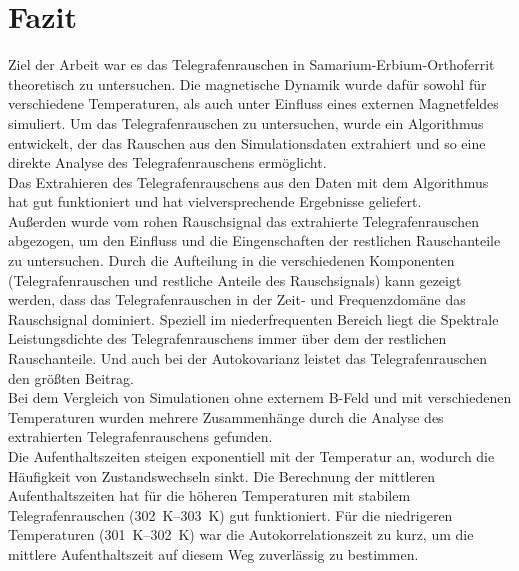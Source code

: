 \documentclass[main.tex]{subfiles}
\begin{document}
\newpage
\section{Fazit}

Ziel der Arbeit war es das Telegrafenrauschen in Samarium-Erbium-Orthoferrit theoretisch zu untersuchen. Die magnetische Dynamik wurde dafür sowohl für verschiedene Temperaturen, als auch unter Einfluss eines externen Magnetfeldes simuliert. 
Um das Telegrafenrauschen zu untersuchen, wurde ein Algorithmus entwickelt, der das Rauschen aus den Simulationsdaten extrahiert und so eine direkte Analyse des Telegrafenrauschens ermöglicht.\\

Das Extrahieren des Telegrafenrauschens aus den Daten mit dem Algorithmus hat gut funktioniert und hat vielversprechende Ergebnisse geliefert.\\
Außerden wurde vom rohen Rauschsignal das extrahierte Telegrafenrauschen abgezogen, um den Einfluss und die Eingenschaften der restlichen Rauschanteile zu untersuchen.
Durch die Aufteilung in die verschiedenen Komponenten (Telegrafenrauschen und restliche Anteile des Rauschsignals) kann gezeigt werden, dass das Telegrafenrauschen in der Zeit- und Frequenzdomäne das Rauschsignal dominiert. Speziell im niederfrequenten Bereich liegt die Spektrale Leistungsdichte des Telegrafenrauschens immer über dem der restlichen Rauschanteile. Und auch bei der Autokovarianz leistet das Telegrafenrauschen den größten Beitrag.\\

Bei dem Vergleich von Simulationen ohne externem B-Feld und mit verschiedenen Temperaturen wurden mehrere Zusammenhänge durch die Analyse des extrahierten Telegrafenrauschens gefunden.\\
Die Aufenthaltszeiten steigen exponentiell mit der Temperatur an, wodurch die Häufigkeit von Zustandswechseln sinkt. Die Berechnung der mittleren Aufenthaltszeiten hat für die höheren Temperaturen mit stabilem Telegrafenrauschen (\SIrange{302}{303}{\kelvin}) gut funktioniert. Für die niedrigeren Temperaturen (\SIrange{301}{302}{\kelvin}) war die Autokorrelationszeit zu kurz, um die mittlere Aufenthaltszeit auf diesem Weg zuverlässig zu bestimmen.\\
\end{document}
